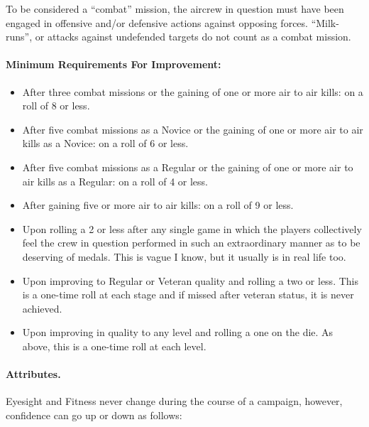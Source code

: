 \begin{advancedrules}
To be considered a “combat” mission, the aircrew in question must have been engaged in offensive and/or defensive actions against opposing forces. “Milk-runs”, or attacks against undefended targets do not count as a combat mission.

\paragraph{Minimum Requirements For Improvement:}

\begin{itemize}

    \item {} After three combat missions or the gaining of one or more air to air kills: on a roll of 8 or less.

    \item {} After five combat missions as a Novice or the gaining of one or more air to air kills as a Novice: on a roll of 6 or less.

    \item {} After five combat missions as a Regular or the gaining of one or more air to air kills as a Regular: on a roll of 4 or less.

    \item {} After gaining five or more air to air kills: on a roll of 9 or less.

    \item {} Upon rolling a 2 or less after any single game in which the players collectively feel the crew in question performed in such an extraordinary manner as to be deserving of medals. This is vague I know, but it usually is in real life too.

    \item {} Upon improving to Regular or Veteran quality and rolling a two or less. This is a one-time roll at each stage and if missed after veteran status, it is never achieved.

    \item {} Upon improving in quality to any level and rolling a one on the die. As above, this is a one-time roll at each level.
    
\end{itemize}

\paragraph{Attributes.} Eyesight and Fitness never change during the course of a campaign, however, confidence can go up or down as follows:
\begin{itemize}


\end{itemize}
\end{advancedrules}
